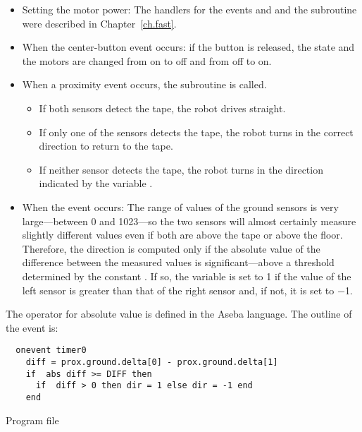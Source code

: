 
\begin{itemize}

\item Setting the motor power: The handlers for the events
 and  and the subroutine
 were described in Chapter~\ref{ch.fast}.

\item When the center-button event occurs: if the button is released,
the state and the motors are changed from on to off and from off to on.

\item When a proximity event occurs, the subroutine  is called.
\begin{itemize}
\item If both sensors detect the tape, the robot drives straight.
\item If only one of the sensors detects the tape, the robot turns in
the correct direction to return to the tape.
\item If neither sensor detects the tape, the robot turns in the
direction indicated by the variable .
\end{itemize}

\item When the  event occurs: The range of values of the
ground sensors is very large---between 0 and 1023---so the two
sensors will almost certainly measure slightly different values even if
both are above the tape or above the floor. Therefore, the direction is
computed only if the absolute value of the difference between the
measured values is significant---above a threshold determined by the
constant . If so, the variable  is set to 1 if the value
of the left sensor is greater than that of the right sensor and, if not,
it is set to $-$1.

\end{itemize}


The operator for absolute value is defined in the Aseba language. The
outline of the  event is:
\begin{verbatim}
  onevent timer0
    diff = prox.ground.delta[0] - prox.ground.delta[1]
    if  abs diff >= DIFF then
      if  diff > 0 then dir = 1 else dir = -1 end
    end
  \end{verbatim}

{\raggedleft \hfill Program file }

